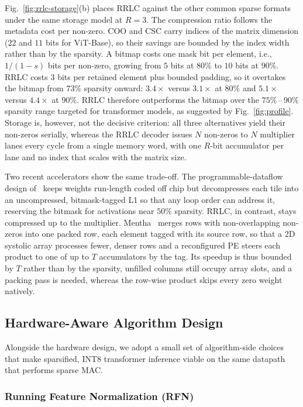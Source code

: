 \documentclass[lettersize,journal]{IEEEtran}
\begin{document}
Fig.~\ref{fig:rrlc-storage}(b) places RRLC against the other common sparse formats under the same storage model at $R{=}3$. The compression ratio follows the metadata cost per non-zero. COO and CSC carry indices of the matrix dimension ($22$ and $11$ bits for ViT-Base), so their savings are bounded by the index width rather than by the sparsity. A bitmap costs one mask bit per element, i.e., $1/(1-s)$ bits per non-zero, growing from $5$ bits at $80\%$ to $10$ bits at $90\%$. RRLC costs $3$ bits per retained element plus bounded padding, so it overtakes the bitmap from $73\%$ sparsity onward: $3.4\times$ versus $3.1\times$ at $80\%$ and $5.1\times$ versus $4.4\times$ at $90\%$. RRLC therefore outperforms the bitmap over the $75\%$\,--\,$90\%$ sparsity range targeted for transformer models, as suggested by Fig.~\ref{fig:profile}. Storage is, however, not the decisive criterion: all three alternatives yield their non-zeros serially, whereas the RRLC decoder issues $N$ non-zeros to $N$ multiplier lanes every cycle from a single memory word, with one $R$-bit accumulator per lane and no index that scales with the matrix size.

Two recent accelerators show the same trade-off. The programmable-dataflow design of~\cite{Schneider2024TCASI} keeps weights run-length coded off chip but decompresses each tile into an uncompressed, bitmask-tagged L1 so that any loop order can address it, reserving the bitmask for activations near $50\%$ sparsity. RRLC, in contrast, stays compressed up to the multiplier. Mentha~\cite{Tang2022Mentha} merges rows with non-overlapping non-zeros into one packed row, each element tagged with its source row, so that a 2D systolic array processes fewer, denser rows and a reconfigured PE steers each product to one of up to $T$ accumulators by the tag. Its speedup is thus bounded by $T$ rather than by the sparsity, unfilled columns still occupy array slots, and a packing pass is needed, whereas the row-wise product skips every zero weight natively.

\subsection{Hardware-Aware Algorithm Design}
\label{sec:algo-hwawer}

Alongside the hardware design, we adopt a small set of algorithm-side choices that make sparsified, INT8 transformer inference viable on the same datapath that performs sparse MAC.

\subsubsection{Running Feature Normalization (RFN)}
\label{sec:algo-rfn}
\end{document}
